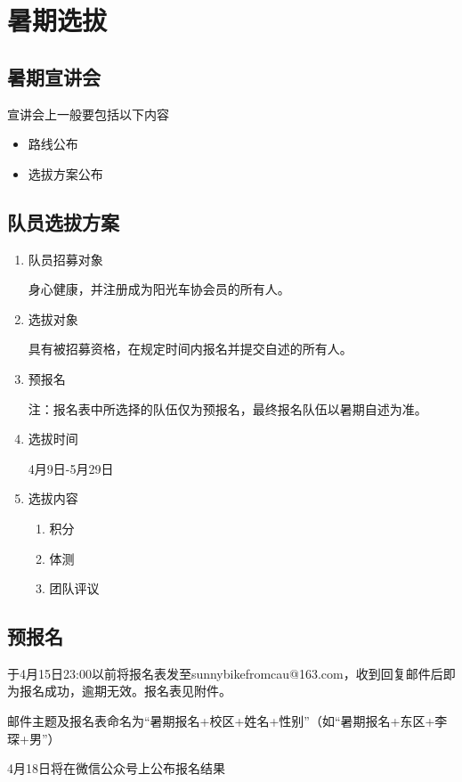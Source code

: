 \documentclass{ctexbook}
\begin{document}
\section{暑期选拔}
\subsection{暑期宣讲会}
宣讲会上一般要包括以下内容
\begin{itemize}
    \item 路线公布
    \item 选拔方案公布
\end{itemize}
\subsection{队员选拔方案}
\begin{enumerate}[label={\chinese*、}]

\item 队员招募对象

身心健康，并注册成为阳光车协会员的所有人。
\item 选拔对象

具有被招募资格，在规定时间内报名并提交自述的所有人。
\item 预报名

注：报名表中所选择的队伍仅为预报名，最终报名队伍以暑期自述为准。
\item  选拔时间

4月9日-5月29日
\item 选拔内容
\begin{enumerate}
\item 积分

\item 体测

\item 团队评议

\end{enumerate}

\end{enumerate}

\subsection{预报名}
于4月15日23:00以前将报名表发至sunnybikefromcau@163.com，收到回复邮件后即为报名成功，逾期无效。报名表见附件。

邮件主题及报名表命名为“暑期报名+校区+姓名+性别”（如“暑期报名+东区+李琛+男”）

4月18日将在微信公众号上公布报名结果
\end{document}
